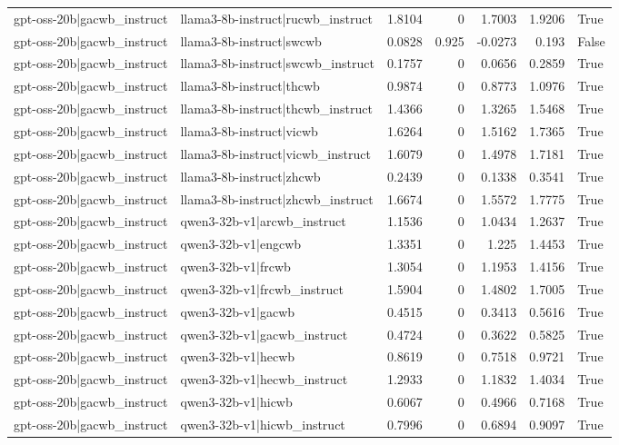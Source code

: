 \begin{table}
\begin{tabular}{l l r r r r l}
gpt-oss-20b|gacwb_instruct & llama3-8b-instruct|rucwb_instruct & 1.8104 & 0 & 1.7003 & 1.9206 & True \\
gpt-oss-20b|gacwb_instruct & llama3-8b-instruct|swcwb & 0.0828 & 0.925 & -0.0273 & 0.193 & False \\
gpt-oss-20b|gacwb_instruct & llama3-8b-instruct|swcwb_instruct & 0.1757 & 0 & 0.0656 & 0.2859 & True \\
gpt-oss-20b|gacwb_instruct & llama3-8b-instruct|thcwb & 0.9874 & 0 & 0.8773 & 1.0976 & True \\
gpt-oss-20b|gacwb_instruct & llama3-8b-instruct|thcwb_instruct & 1.4366 & 0 & 1.3265 & 1.5468 & True \\
gpt-oss-20b|gacwb_instruct & llama3-8b-instruct|vicwb & 1.6264 & 0 & 1.5162 & 1.7365 & True \\
gpt-oss-20b|gacwb_instruct & llama3-8b-instruct|vicwb_instruct & 1.6079 & 0 & 1.4978 & 1.7181 & True \\
gpt-oss-20b|gacwb_instruct & llama3-8b-instruct|zhcwb & 0.2439 & 0 & 0.1338 & 0.3541 & True \\
gpt-oss-20b|gacwb_instruct & llama3-8b-instruct|zhcwb_instruct & 1.6674 & 0 & 1.5572 & 1.7775 & True \\
gpt-oss-20b|gacwb_instruct & qwen3-32b-v1|arcwb_instruct & 1.1536 & 0 & 1.0434 & 1.2637 & True \\
gpt-oss-20b|gacwb_instruct & qwen3-32b-v1|engcwb & 1.3351 & 0 & 1.225 & 1.4453 & True \\
gpt-oss-20b|gacwb_instruct & qwen3-32b-v1|frcwb & 1.3054 & 0 & 1.1953 & 1.4156 & True \\
gpt-oss-20b|gacwb_instruct & qwen3-32b-v1|frcwb_instruct & 1.5904 & 0 & 1.4802 & 1.7005 & True \\
gpt-oss-20b|gacwb_instruct & qwen3-32b-v1|gacwb & 0.4515 & 0 & 0.3413 & 0.5616 & True \\
gpt-oss-20b|gacwb_instruct & qwen3-32b-v1|gacwb_instruct & 0.4724 & 0 & 0.3622 & 0.5825 & True \\
gpt-oss-20b|gacwb_instruct & qwen3-32b-v1|hecwb & 0.8619 & 0 & 0.7518 & 0.9721 & True \\
gpt-oss-20b|gacwb_instruct & qwen3-32b-v1|hecwb_instruct & 1.2933 & 0 & 1.1832 & 1.4034 & True \\
gpt-oss-20b|gacwb_instruct & qwen3-32b-v1|hicwb & 0.6067 & 0 & 0.4966 & 0.7168 & True \\
gpt-oss-20b|gacwb_instruct & qwen3-32b-v1|hicwb_instruct & 0.7996 & 0 & 0.6894 & 0.9097 & True \\

\end{tabular}
\end{table}
